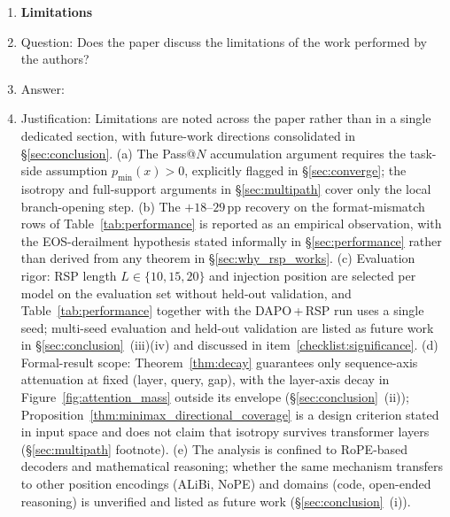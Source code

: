 \begin{enumerate}
    (iv) The same input-side perturbation composes with DAPO's loss-side diversity preservation: DAPO\,+\,RSP attains a five-benchmark average of $54.36\%$ (vs DAPO's $53.20\%$ peak; $+1.16$\,pp at peak, $+3.10$\,pp at step~100), with the post-peak DAPO decline delayed (Table~\ref{tab:dapo_peak}, Figure~\ref{fig:dapo_curve}).

\item {\bf Limitations}
    \item[] Question: Does the paper discuss the limitations of the work performed by the authors?
    \item[] Answer: \answerYes{}
    \item[] Justification: Limitations are noted across the paper rather than in a single dedicated section, with future-work directions consolidated in \S\ref{sec:conclusion}. (a) The Pass@$N$ accumulation argument requires the task-side assumption $p_{\min}(x)>0$, explicitly flagged in \S\ref{sec:converge}; the isotropy and full-support arguments in \S\ref{sec:multipath} cover only the local branch-opening step. (b) The $+18$--$29$\,pp recovery on the format-mismatch rows of Table~\ref{tab:performance} is reported as an empirical observation, with the EOS-derailment hypothesis stated informally in \S\ref{sec:performance} rather than derived from any theorem in \S\ref{sec:why_rsp_works}. (c) Evaluation rigor: RSP length $L\in\{10,15,20\}$ and injection position are selected per model on the evaluation set without held-out validation, and Table~\ref{tab:performance} together with the DAPO\,+\,RSP run uses a single seed; multi-seed evaluation and held-out validation are listed as future work in \S\ref{sec:conclusion}~(iii)(iv) and discussed in item~\ref{checklist:significance}. (d) Formal-result scope: Theorem~\ref{thm:decay} guarantees only sequence-axis attenuation at fixed (layer, query, gap), with the layer-axis decay in Figure~\ref{fig:attention_mass} outside its envelope (\S\ref{sec:conclusion}~(ii)); Proposition~\ref{thm:minimax_directional_coverage} is a design criterion stated in input space and does not claim that isotropy survives transformer layers (\S\ref{sec:multipath} footnote). (e) The analysis is confined to RoPE-based decoders and mathematical reasoning; whether the same mechanism transfers to other position encodings (ALiBi, NoPE) and domains (code, open-ended reasoning) is unverified and listed as future work (\S\ref{sec:conclusion}~(i)).


\end{enumerate}
